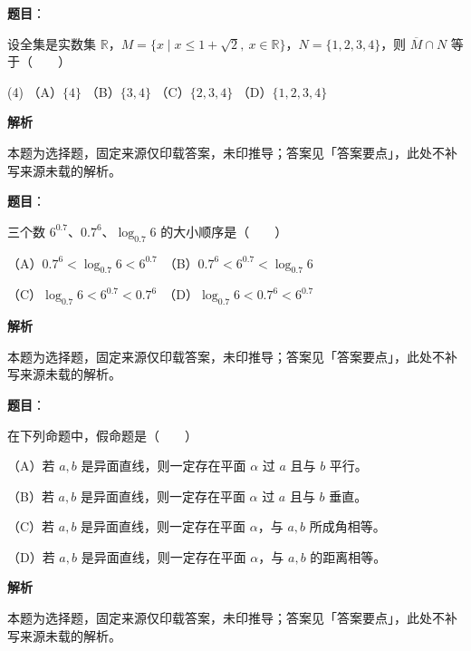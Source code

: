 

\begin{answer}

\textbf{题目}：

设全集是实数集 $\mathbb R$，$M=\{x\mid x\le 1+\sqrt2,\ x\in\mathbb R\}$，$N=\{1,2,3,4\}$，则 $\overline M\cap N$ 等于\mbox{（　　）}

\begin{gkopts}(4)
\task （A）$\{4\}$
\task （B）$\{3,4\}$
\task （C）$\{2,3,4\}$
\task （D）$\{1,2,3,4\}$
\end{gkopts}

\textbf{解析}

本题为选择题，固定来源仅印载答案，未印推导；答案见「答案要点」，此处不补写来源未载的解析。


\end{answer}
\begin{answer}

\textbf{题目}：

三个数 $6^{0.7}$、$0.7^6$、$\log_{0.7}6$ 的大小顺序是\mbox{（　　）}

（A）$0.7^6<\log_{0.7}6<6^{0.7}$　（B）$0.7^6<6^{0.7}<\log_{0.7}6$

（C）$\log_{0.7}6<6^{0.7}<0.7^6$　（D）$\log_{0.7}6<0.7^6<6^{0.7}$

\textbf{解析}

本题为选择题，固定来源仅印载答案，未印推导；答案见「答案要点」，此处不补写来源未载的解析。


\end{answer}
\begin{answer}

\textbf{题目}：

在下列命题中，假命题是\mbox{（　　）}

（A）若 $a,b$ 是异面直线，则一定存在平面 $\alpha$ 过 $a$ 且与 $b$ 平行。

（B）若 $a,b$ 是异面直线，则一定存在平面 $\alpha$ 过 $a$ 且与 $b$ 垂直。

（C）若 $a,b$ 是异面直线，则一定存在平面 $\alpha$，与 $a,b$ 所成角相等。

（D）若 $a,b$ 是异面直线，则一定存在平面 $\alpha$，与 $a,b$ 的距离相等。

\textbf{解析}

本题为选择题，固定来源仅印载答案，未印推导；答案见「答案要点」，此处不补写来源未载的解析。


\end{answer}
